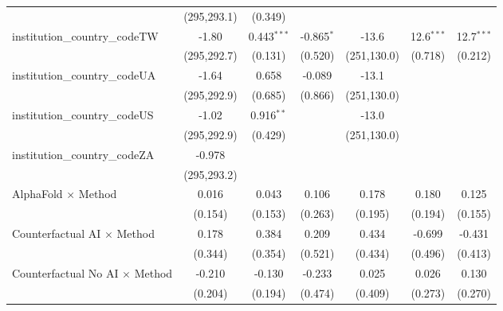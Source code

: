 \begin{tabular}{lcccccc}
                                         & (295,293.1)   & (0.349)       &               &               &               &   \\   
   institution\_country\_codeTW          & -1.80         & 0.443$^{***}$ & -0.865$^{*}$  & -13.6         & 12.6$^{***}$  & 12.7$^{***}$\\   
                                         & (295,292.7)   & (0.131)       & (0.520)       & (251,130.0)   & (0.718)       & (0.212)\\   
   institution\_country\_codeUA          & -1.64         & 0.658         & -0.089        & -13.1         &               &   \\   
                                         & (295,292.9)   & (0.685)       & (0.866)       & (251,130.0)   &               &   \\   
   institution\_country\_codeUS          & -1.02         & 0.916$^{**}$  &               & -13.0         &               &   \\   
                                         & (295,292.9)   & (0.429)       &               & (251,130.0)   &               &   \\   
   institution\_country\_codeZA          & -0.978        &               &               &               &               &   \\   
                                         & (295,293.2)   &               &               &               &               &   \\   
   AlphaFold $\times$ Method             & 0.016         & 0.043         & 0.106         & 0.178         & 0.180         & 0.125\\   
                                         & (0.154)       & (0.153)       & (0.263)       & (0.195)       & (0.194)       & (0.155)\\   
   Counterfactual AI $\times$ Method     & 0.178         & 0.384         & 0.209         & 0.434         & -0.699        & -0.431\\   
                                         & (0.344)       & (0.354)       & (0.521)       & (0.434)       & (0.496)       & (0.413)\\   
   Counterfactual No AI $\times$ Method  & -0.210        & -0.130        & -0.233        & 0.025         & 0.026         & 0.130\\   
                                         & (0.204)       & (0.194)       & (0.474)       & (0.409)       & (0.273)       & (0.270)\\   

\end{tabular}
